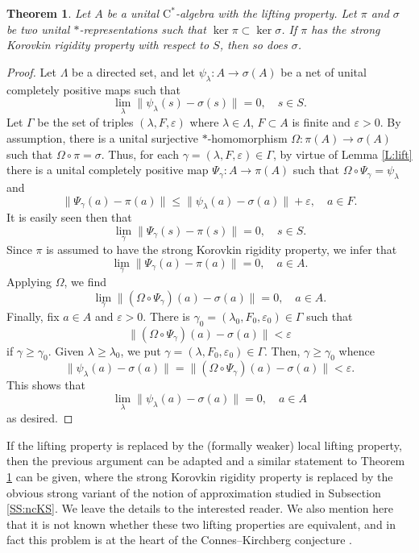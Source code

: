 \documentclass[10pt]{amsart}
\newcommand{\rC}{\mathrm{C}}
\newcommand{\eps}{\varepsilon}
\newtheorem{theorem}[lemma]{Theorem}
\theoremstyle{definition}
\begin{document}
\begin{theorem}\label{T:lift}
Let $A$ be a unital $\rC^*$-algebra with the lifting property. Let $\pi$ and $\sigma$ be two unital $*$-representations such that $\ker\pi\subset \ker \sigma$. If $\pi$ has the strong Korovkin rigidity property with respect to $S$, then so does $\sigma$.
\end{theorem}
\begin{proof}

Let $\Lambda$ be a directed set, and let $\psi_\lambda:A\to \sigma(A)$ be a net of unital completely positive maps such that
\[
\lim_{\lambda}\|\psi_\lambda(s)-\sigma(s)\|=0, \quad s\in S.
\]
Let $\Gamma$ be the set of triples $(\lambda, F,\eps)$ where $\lambda\in \Lambda$, $F\subset A$ is finite and $\eps>0$. 
By assumption, there is a unital surjective $*$-homomorphism $\Omega:\pi(A)\to \sigma(A)$ such that $\Omega\circ\pi=\sigma$. Thus, for each $\gamma=(\lambda,F,\eps)\in \Gamma$, by virtue of Lemma \ref{L:lift} there is a unital completely positive map $\Psi_\gamma:A\to \pi(A)$ such that 
$\Omega\circ \Psi_\gamma =\psi_\lambda$ and
\[
\|\Psi_\gamma (a)-\pi(a)\|\leq \| \psi_\lambda (a)-\sigma(a)\|+\eps, \quad a\in F.
\]
It is easily seen then that 
\[
\lim_\gamma \|\Psi_\gamma(s)-\pi(s)\|=0, \quad s\in S.
\]
Since $\pi$ is assumed to have the strong Korovkin rigidity property, we infer that
\[
\lim_\gamma \|\Psi_\gamma(a)-\pi(a)\|=0, \quad a\in A.
\]
Applying $\Omega$, we find
\[
\lim_\gamma \|(\Omega\circ\Psi_\gamma)(a)-\sigma(a)\|=0, \quad a\in A.
\]
Finally, fix $a\in A$ and $\eps>0$. There is $\gamma_0=(\lambda_0,F_0,\eps_0)\in \Gamma$ such that 
\[
 \|(\Omega\circ\Psi_\gamma)(a)-\sigma(a)\|<\eps
\]
if $\gamma\geq \gamma_0$. Given  $\lambda\geq \lambda_0$, we put $\gamma=(\lambda,F_0,\eps_0)\in \Gamma$. Then, $\gamma\geq \gamma_0$ whence
\[
\|\psi_{\lambda}(a)-\sigma(a)\|=\|(\Omega\circ\Psi_\gamma)(a)-\sigma(a)\|<\eps.
\]
This shows that 
\[
\lim_{\lambda}\|\psi_\lambda(a)-\sigma(a)\|=0, \quad a\in A
\]
as desired.
\end{proof}

If the lifting property is replaced by the (formally weaker) local lifting property, then the previous argument can be adapted and a similar statement to Theorem \ref{T:lift} can be given, where the strong Korovkin rigidity property is replaced by the obvious strong variant of the notion of approximation studied in Subsection \ref{SS:ncKS}. 
We leave the details to the interested reader.   We also mention here that it is not known whether these two lifting properties are equivalent, and in fact this problem is at the heart of the Connes--Kirchberg conjecture \cite{pisier2023lifting}.
\end{document}

